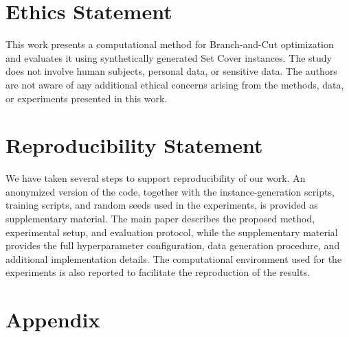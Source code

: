 \documentclass{article}
\begin{document}
\section*{Ethics Statement} 

This work presents a computational method for Branch-and-Cut optimization and evaluates it using synthetically generated Set Cover instances. The study does not involve human subjects, personal data, or sensitive data. The authors are not aware of any additional ethical concerns arising from the methods, data, or experiments presented in this work.

\section*{Reproducibility Statement} 

We have taken several steps to support reproducibility of our work. An anonymized version of the code, together with the instance-generation scripts, training scripts, and random seeds used in the experiments, is provided as supplementary material. The main paper describes the proposed method, experimental setup, and evaluation protocol, while the supplementary material provides the full hyperparameter configuration, data generation procedure, and additional implementation details. The computational environment used for the experiments is also reported to facilitate the reproduction of the results.







\appendix
\section{Appendix}
\end{document}
